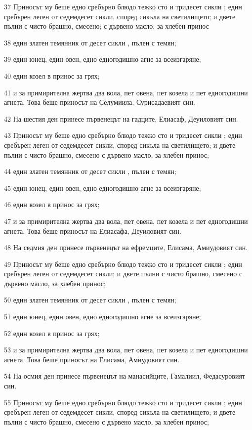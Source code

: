 \par 37 Приносът му беше едно сребърно блюдо тежко сто и тридесет сикли ; един сребърен леген от седемдесет сикли, според сикъла на светилището; и двете пълни с чисто брашно, смесено; с дървено масло, за хлебен принос
\par 38 един златен темянник от десет сикли , пълен с темян;
\par 39 един юнец, един овен, едно едногодишно агне за всеизгаряне;
\par 40 един козел в принос за грях;
\par 41 и за примирителна жертва два вола, пет овена, пет козела и пет едногодишни агнета. Това беше приносът на Селумиила, Сурисадаевият син.
\par 42 На шестия ден принесе първенецът на гадците, Елиасаф, Деуиловият син.
\par 43 Приносът му беше едно сребърно блюдо тежко сто и тридесет сикли ; един сребърен леген от седемдесет сикли, според сикъла на светилището; и двете пълни с чисто брашно, смесено с дървено масло, за хлебен принос;
\par 44 един златен темянник от десет сикли , пълен с темян;
\par 45 един юнец, един овен, едно едногодишно агне за всеизгаряне;
\par 46 един козел в принос за грях;
\par 47 и за примирителна жертва два вола, пет овена, пет козела и пет едногодишни агнета. Това беше приносът на Елиасафа, Деуиловият син.
\par 48 На седмия ден принесе първенецът на ефремците, Елисама, Амиудовият син.
\par 49 Приносът му беше едно сребърно блюдо тежко сто и тридесет сикли ; един сребърен леген от седемдесет сикли; и двете пълни с чисто брашно, смесено с дървено масло, за хлебен принос;
\par 50 един златен темянник от десет сикли , пълен с темян;
\par 51 един юнец, един овен, едно едногодишно агне за всеизгаряне;
\par 52 един козел в принос за грях;
\par 53 и за примирителна жертва два вола, пет овена, пет козела и пет едногодишни агнета. Това беше приносът на Елисама, Амиудовият син.
\par 54 На осмия ден принесе първенецът на манасийците, Гамалиил, Федасуровият син.
\par 55 Приносът му беше едно сребърно блюдо тежко сто и тридесет сикли ; един сребърен леген от седемдесет сикли, според сикъла на светилището; и двете пълни с чисто брашно, смесено с дървено масло, за хлебен принос;
